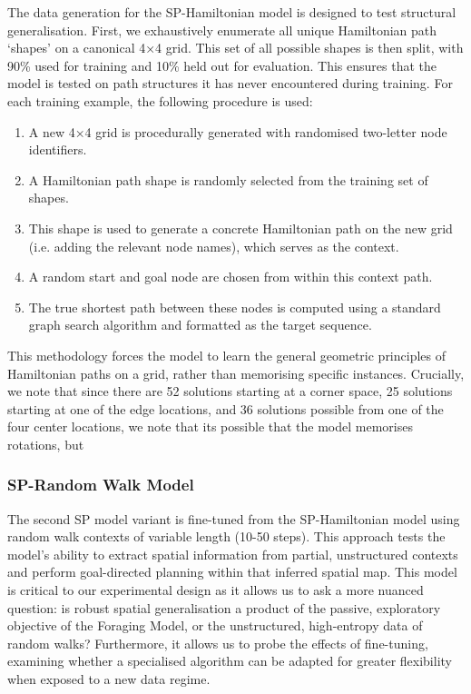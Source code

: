 The data generation for the SP-Hamiltonian model is designed to test structural generalisation. First, we exhaustively enumerate all unique Hamiltonian path `shapes' on a canonical 4×4 grid. This set of all possible shapes is then split, with 90\% used for training and 10\% held out for evaluation. This ensures that the model is tested on path structures it has never encountered during training.
For each training example, the following procedure is used:
\begin{enumerate}
\item A new 4×4 grid is procedurally generated with randomised two-letter node identifiers.
\item A Hamiltonian path shape is randomly selected from the training set of shapes.
\item This shape is used to generate a concrete Hamiltonian path on the new grid (i.e. adding the relevant node names), which serves as the context.
\item A random start and goal node are chosen from within this context path.
\item The true shortest path between these nodes is computed using a standard graph search algorithm and formatted as the target sequence.
\end{enumerate}
This methodology forces the model to learn the general geometric principles of Hamiltonian paths on a grid, rather than memorising specific instances. Crucially, we note that since there are 52 solutions starting at a corner space, 25 solutions starting at one of the edge locations, and 36 solutions possible from one of the four center locations, we note that its possible that the model memorises rotations, but 

\subsubsection{SP-Random Walk Model}

The second SP model variant is fine-tuned from the SP-Hamiltonian model using random walk contexts of variable length (10-50 steps). This approach tests the model's ability to extract spatial information from partial, unstructured contexts and perform goal-directed planning within that inferred spatial map. This model is critical to our experimental design as it allows us to ask a more nuanced question: is robust spatial generalisation a product of the passive, exploratory objective of the Foraging Model, or the unstructured, high-entropy data of random walks? Furthermore, it allows us to probe the effects of fine-tuning, examining whether a specialised algorithm can be adapted for greater flexibility when exposed to a new data regime.  

